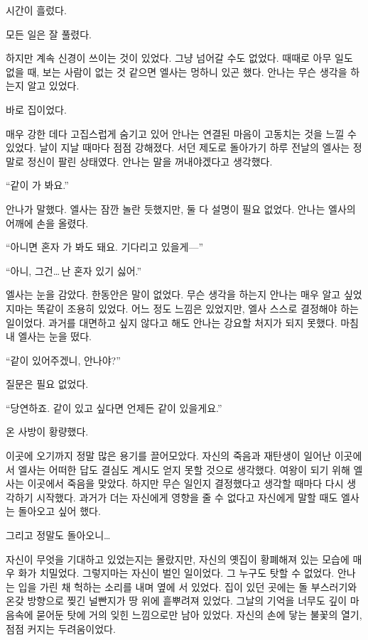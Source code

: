 시간이 흘렀다.

모든 일은 잘 풀렸다.

하지만 계속 신경이 쓰이는 것이 있었다. 그냥 넘어갈 수도 없었다. 때때로 아무 일도 없을 때, 보는 사람이 없는 것 같으면 엘사는 멍하니 있곤 했다. 안나는 무슨 생각을 하는지 알고 있었다.

바로 집이었다.

매우 강한 데다 고집스럽게 숨기고 있어 안나는 연결된 마음이 고동치는 것을 느낄 수 있었다. 날이 지날 때마다 점점 강해졌다. 서던 제도로 돌아가기 하루 전날의 엘사는 정말로 정신이 팔린 상태였다. 안나는 말을 꺼내야겠다고 생각했다.

``같이 가 봐요.''

안나가 말했다. 엘사는 잠깐 놀란 듯했지만, 둘 다 설명이 필요 없었다. 안나는 엘사의 어깨에 손을 올렸다.

``아니면 혼자 가 봐도 돼요. 기다리고 있을게—''

``아니, 그건\ldots\,난 혼자 있기 싫어.''

엘사는 눈을 감았다. 한동안은 말이 없었다. 무슨 생각을 하는지 안나는 매우 알고 싶었지마는 똑같이 조용히 있었다. 어느 정도 느낌은 있었지만, 엘사 스스로 결정해야 하는 일이었다. 과거를 대면하고 싶지 않다고 해도 안나는 강요할 처지가 되지 못했다. 마침내 엘사는 눈을 떴다.

``같이 있어주겠니, 안나야?''

질문은 필요 없었다.

``당연하죠. 같이 있고 싶다면 언제든 같이 있을게요.''

\textbreak

온 사방이 황량했다.

이곳에 오기까지 정말 많은 용기를 끌어모았다. 자신의 죽음과 재탄생이 일어난 이곳에서 엘사는 어떠한 답도 결심도 계시도 얻지 못할 것으로 생각했다. 여왕이 되기 위해 엘사는 이곳에서 죽음을 맞았다. 하지만 무슨 일인지 결정했다고 생각할 때마다 다시 생각하기 시작했다. 과거가 더는 자신에게 영향을 줄 수 없다고 자신에게 말할 때도 엘사는 돌아오고 싶어 했다.

그리고 정말도 돌아오니\ldots

자신이 무엇을 기대하고 있었는지는 몰랐지만, 자신의 옛집이 황폐해져 있는 모습에 매우 화가 치밀었다. 그렇지마는 자신이 벌인 일이었다. 그 누구도 탓할 수 없었다. 안나는 입을 가린 채 헉하는 소리를 내며 옆에 서 있었다. 집이 있던 곳에는 돌 부스러기와 온갖 방향으로 찢긴 널빤지가 땅 위에 흩뿌려져 있었다. 그날의 기억을 너무도 깊이 마음속에 묻어둔 탓에 거의 잊힌 느낌으로만 남아 있었다. 자신의 손에 닿는 불꽃의 열기, 점점 커지는 두려움이었다.

